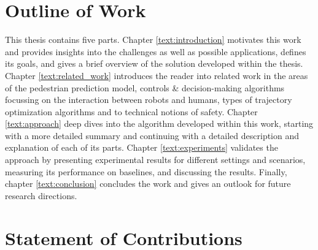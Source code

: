 \section{Outline of Work}
\label{text:introduction/outline}
This thesis contains five parts. Chapter \ref{text:introduction} motivates this work and provides insights into the challenges as well as possible applications, defines its goals, and gives a brief overview of the solution developed within the thesis. Chapter \ref{text:related_work} introduces the reader into related work in the areas of the pedestrian prediction model, controls \& decision-making algorithms focussing on the interaction between robots and humans, types of trajectory optimization algorithms and to technical notions of safety. Chapter \ref{text:approach} deep dives into the algorithm developed within this work, starting with a more detailed summary and continuing with a detailed description and explanation of each of its parts. Chapter \ref{text:experiments} validates the approach by presenting experimental results for different settings and scenarios, measuring its performance on baselines, and discussing the results. Finally, chapter \ref{text:conclusion} concludes the work and gives an outlook for future research directions.

\section{Statement of Contributions}
\label{text:introduction/contributions}
